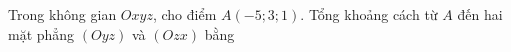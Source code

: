 \begin{ex}
Trong không gian $Oxyz$, cho điểm $A(-5;3;1)$. Tổng khoảng cách từ $A$ đến hai mặt phẳng $(Oyz)$ và $(Ozx)$ bằng
\end{ex}
